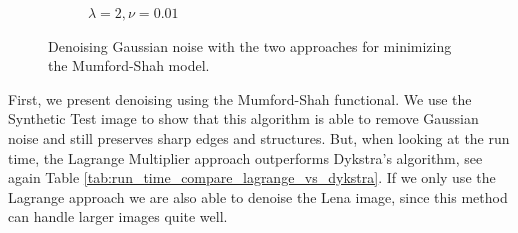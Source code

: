\documentclass[abstracton]{scrreprt}
\begin{document}
\begin{figure}[!ht]
\begin{subfigure}[b]{0.22\textwidth}
                    \caption{$\lambda = 2, \nu = 0.01$}
                \end{subfigure}
                \caption[Removing Gaussian noise with convex relaxed Mumford-Shah.]{Denoising Gaussian noise with the two approaches for minimizing the Mumford-Shah model.}
            \label{fig:synth_gauss_ms_compare}
            \end{figure}
            First, we present denoising using the Mumford-Shah functional. We use the Synthetic Test image to show that this algorithm is able to remove Gaussian noise and still preserves sharp edges and structures. But, when looking at the run time, the Lagrange Multiplier approach outperforms Dykstra's algorithm, see again Table \ref{tab:run_time_compare_lagrange_vs_dykstra}. If we only use the Lagrange approach we are also able to denoise the Lena image, since this method can handle larger images quite well.
\end{document}
